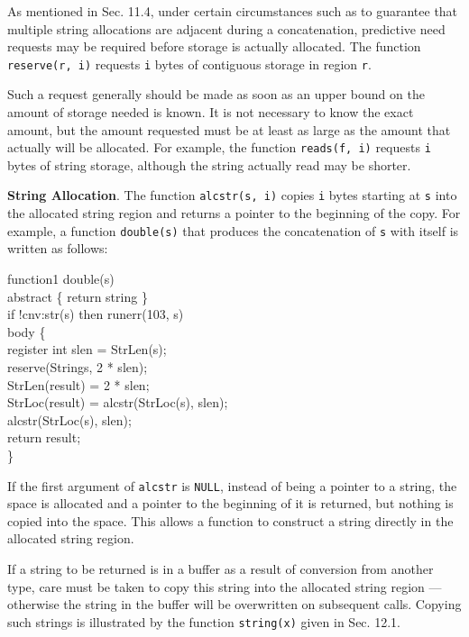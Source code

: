 As mentioned in Sec. 11.4, under certain circumstances such as to
guarantee that multiple string allocations are adjacent during a
concatenation, predictive need requests may be required before storage
is actually allocated.  The function \texttt{reserve(r, i)} requests
\texttt{i} bytes of contiguous storage in region \texttt{r}.

Such a request generally should be made as soon as an upper bound on the
amount of storage needed is known. It is not necessary to know the exact
amount, but the amount requested must be at least as large as the amount
that actually will be allocated. For example, the function
\texttt{reads(f, i)} requests \texttt{i} bytes of string storage, although
the string actually read may be shorter.

\textbf{String Allocation}. The function \texttt{alcstr(s, i)} copies
\texttt{i} bytes starting at \texttt{s} into the allocated string region
and returns a pointer to the beginning of the copy. For example, a function
\texttt{double(s)} that produces the concatenation of \texttt{s} with
itself is written as follows:
\goodbreak
\begin{iconcode}
function{1} double(s)\\
abstract \{ return string \} \\
if !cnv:str(s) then runerr(103, s) \\
body \{\\
\>register int slen = StrLen(s);\\
\>reserve(Strings, 2 * slen);\\
\>StrLen(result) = 2 * slen;\\
\>StrLoc(result) = alcstr(StrLoc(s), slen);\\
\>alcstr(StrLoc(s), slen);\\
\>return result;\\
\}
\end{iconcode}

If the first argument of \texttt{alcstr} is \texttt{NULL}, instead of being
a pointer to a string, the space is allocated and a pointer to the
beginning of it is returned, but nothing is copied into the space. This
allows a function to construct a string directly in the allocated string
region.

If a string to be returned is in a buffer as a result of conversion
from another type, care must be taken to copy this string into the
allocated string region --- otherwise the string in the buffer will
be overwritten on subsequent calls. Copying such strings is
illustrated by the function \texttt{string(x)} given in Sec. 12.1.


